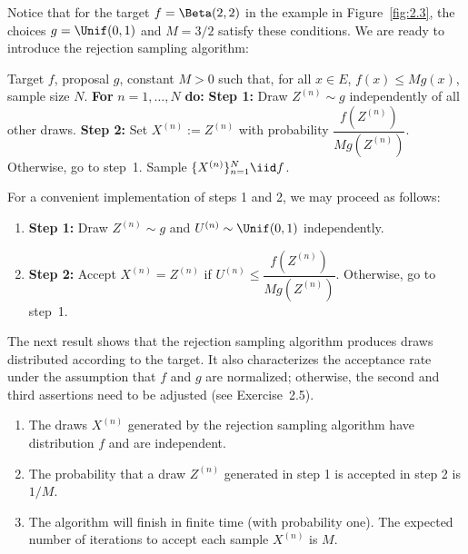 Notice that for the target $f = \Beta(2,2)$ in the example in Figure~\ref{fig:2.3}, the choices $g = \Unif(0,1)$ and
$M = 3/2$ satisfy these conditions. We are ready to introduce the rejection sampling algorithm:

\begin{algorithm}[H]
\caption{Rejection Sampling}
\label{alg:2.3}
\begin{algorithmic}[1]
\Require Target $f$, proposal $g$, constant $M > 0$ such that, for all $x \in E$, $f(x) \le Mg(x)$, sample size $N$.
\State \textbf{For} $n = 1, \ldots, N$ \textbf{do:}
\State \quad \textbf{Step 1:} Draw $Z^{(n)} \sim g$ independently of all other draws.
\State \quad \textbf{Step 2:} Set $X^{(n)} := Z^{(n)}$ with probability $\dfrac{f(Z^{(n)})}{Mg(Z^{(n)})}$. Otherwise, go to step~1.
\Ensure Sample $\{X^{(n)}\}_{n=1}^N \iid f$.
\end{algorithmic}
\end{algorithm}

For a convenient implementation of steps 1 and 2, we may proceed as follows:

\medskip
\begin{enumerate}
  \item \textbf{Step 1:} Draw $Z^{(n)} \sim g$ and $U^{(n)} \sim \Unif(0,1)$ independently.
  \item \textbf{Step 2:} Accept $X^{(n)} = Z^{(n)}$ if $U^{(n)} \le \dfrac{f(Z^{(n)})}{Mg(Z^{(n)})}$. Otherwise, go to step~1.
\end{enumerate}
\medskip

\noindent{}
\medskip

The next result shows that the rejection sampling algorithm produces draws distributed according to the target. It also characterizes the acceptance rate under the assumption that $f$ and $g$ are normalized; otherwise, the second and third assertions need to be adjusted (see Exercise~2.5).

\begin{theorem}
\label{thm:2.6}
\begin{enumerate}
  \item The draws $X^{(n)}$ generated by the rejection sampling algorithm have distribution $f$ and are independent.
  \item The probability that a draw $Z^{(n)}$ generated in step 1 is accepted in step 2 is $1/M$.
  \item The algorithm will finish in finite time (with probability one). The expected number of iterations to accept each sample $X^{(n)}$ is $M$.
\end{enumerate}
\end{theorem}


